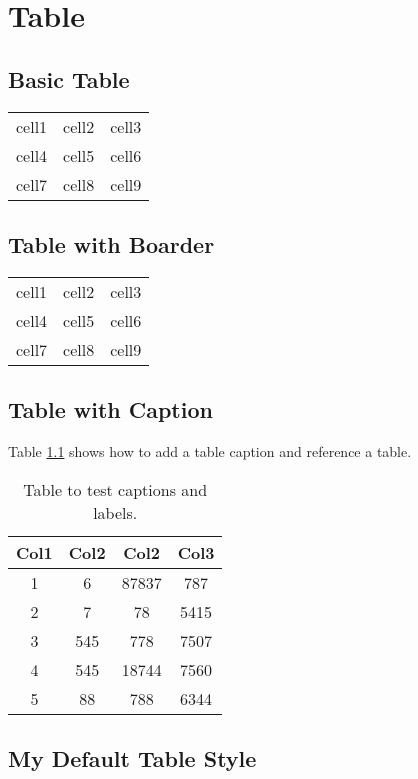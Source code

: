 \chapter{Table}

\section{Basic Table}
\begin{center}
	\begin{tabular}{c c c}
		cell1 & cell2 & cell3 \\ 
		cell4 & cell5 & cell6 \\  
		cell7 & cell8 & cell9    
	\end{tabular}
\end{center}

\section{Table with Boarder}

\begin{tabular}{|c|c|c|} 
	\hline
	cell1 & cell2 & cell3 \\ 
	cell4 & cell5 & cell6 \\ 
	cell7 & cell8 & cell9 \\ 
	\hline
\end{tabular}

\section{Table with Caption}

Table \ref{table:data} shows how to add a table caption and reference a table.
\begin{table}[h!]
	\centering
	\begin{tabular}{||c c c c||} 
		\hline
		Col1 & Col2 & Col2 & Col3 \\ [0.5ex] 
		\hline\hline
		1 & 6 & 87837 & 787 \\ 
		2 & 7 & 78 & 5415 \\
		3 & 545 & 778 & 7507 \\
		4 & 545 & 18744 & 7560 \\
		5 & 88 & 788 & 6344 \\ [1ex] 
		\hline
	\end{tabular}
	\caption{Table to test captions and labels.}
	\label{table:data}
\end{table}


\section{My Default Table Style}

